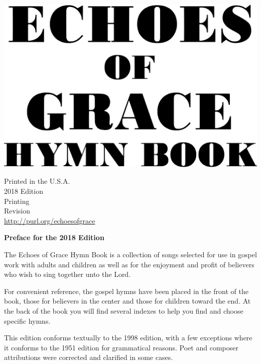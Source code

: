\documentclass{book}
\begin{document}

\vspace*{1in}

\noindent\hfil\includegraphics[scale=0.06]{booklayout/bodoni-scan}\hfil

\vfill



\pagebreak

\vspace*{\fill}
\begin{center}
Printed in the U.S.A.\\
2018 Edition\\
\the\year{} Printing\\
Revision \\
\url{http://purl.org/echoesofgrace}
\end{center}

\pagebreak


\vspace*{1.5in}
\noindent\hfil{\textbf{Preface for the 2018 Edition}}\hfil

The {\textit{}Echoes of Grace Hymn Book} is a collection of songs selected for
use in gospel work with adults and children as well as for the enjoyment and
profit of believers who wish to sing together unto the Lord.

For convenient reference, the gospel hymns have been placed in the front of the
book, those for believers in the center and those for children toward the end.
At the back of the book you will find several indexes to help you find and
choose specific hymns.

This edition conforms textually to the 1998 edition, with a few exceptions
where it conforms to the 1951 edition for grammatical reasons. Poet and
composer attributions were corrected and clarified in some cases.
\end{document}
